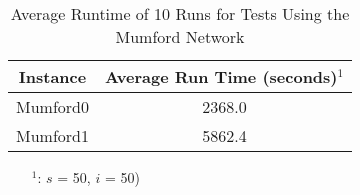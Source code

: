 \begin{table}[H]
    \centering
    \hspace*{-1.0cm}
    \begin{tabular}{|c|c|}
        \hline
        \textbf{Instance} & \textbf{Average Run Time (seconds)$^1$} \\
        \hline
        Mumford0 & 2368.0\\
        \hline
        Mumford1 & 5862.4\\
        \hline
    \end{tabular}
    \caption{Average Runtime of 10 Runs for Tests Using the Mumford Network}
    \label{tabel:runTimeMumford}
    \begin{itemize}[noitemsep]
    \item[$^1$:] $s$ = 50, $i$ = 50)
    \end{itemize} 
\end{table}







